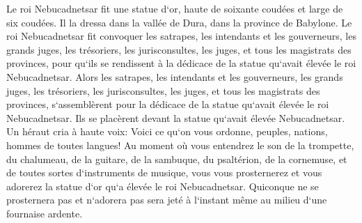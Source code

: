\verse Le roi Nebucadnetsar fit une statue d`or, haute de soixante coudées et large de six coudées. Il la dressa dans la vallée de Dura, dans la province de Babylone. 
\verse Le roi Nebucadnetsar fit convoquer les satrapes, les intendants et les gouverneurs, les grands juges, les trésoriers, les jurisconsultes, les juges, et tous les magistrats des provinces, pour qu`ils se rendissent à la dédicace de la statue qu`avait élevée le roi Nebucadnetsar. 
\verse Alors les satrapes, les intendants et les gouverneurs, les grands juges, les trésoriers, les jurisconsultes, les juges, et tous les magistrats des provinces, s`assemblèrent pour la dédicace de la statue qu`avait élevée le roi Nebucadnetsar. Ils se placèrent devant la statue qu`avait élevée Nebucadnetsar. 
\verse Un héraut cria à haute voix: Voici ce qu`on vous ordonne, peuples, nations, hommes de toutes langues! 
\verse Au moment où vous entendrez le son de la trompette, du chalumeau, de la guitare, de la sambuque, du psaltérion, de la cornemuse, et de toutes sortes d`instruments de musique, vous vous prosternerez et vous adorerez la statue d`or qu`a élevée le roi Nebucadnetsar. 
\verse Quiconque ne se prosternera pas et n`adorera pas sera jeté à l`instant même au milieu d`une fournaise ardente. 
